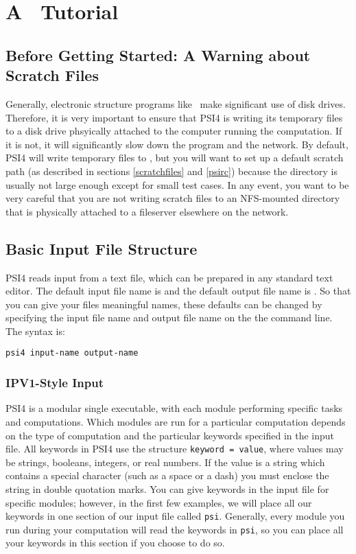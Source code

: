 \section{A \PSIfour\ Tutorial} \label{tutorial}

\subsection{Before Getting Started: A Warning about Scratch Files}
Generally, electronic structure programs like \PSIfour\ make
significant use of disk drives.  Therefore, it is very important
to ensure that PSI4 is writing its temporary files to a disk drive
phsyically attached to the computer running the computation.  If it
is not, it will significantly slow down the program and the network.
By default, PSI4 will write temporary files to , but you
will want to set up a default scratch path (as described in sections
\ref{scratchfiles} and \ref{psirc}) because the  directory
is usually not large enough except for small test cases.  In any 
event, you want to be very careful that you are not writing scratch
files to an NFS-mounted directory that is physically attached to a 
fileserver elsewhere on the network.

\subsection{Basic Input File Structure} 

PSI4 reads input from a text file, which can be prepared in any standard
text editor.  The default input file name is  and the
default output file name is .  So that you can give your
files meaningful names, these defaults can be changed by specifying
the input file name and output file name on the the command line.
The syntax is:

{\tt psi4 input-name output-name}

\subsubsection{IPV1-Style Input}
PSI4 is a modular single executable, with each module performing specific tasks
and computations.  Which modules are run for a particular computation
depends on the type of computation and the particular keywords specified
in the input file.  All keywords in PSI4 use the structure {\tt keyword =
value}, where values may be strings, booleans, integers, or real numbers.
If the value is a string which contains a special character (such as a
space or a dash) you must enclose the string in double quotation marks.
You can give keywords in the input file for specific modules; however,
in the first few examples, we will place all our keywords in one section
of our input file called {\tt psi}.  Generally, every module you run
during your computation will read the keywords in {\tt psi}, so you
can place all your keywords in this section if you choose to do so.

